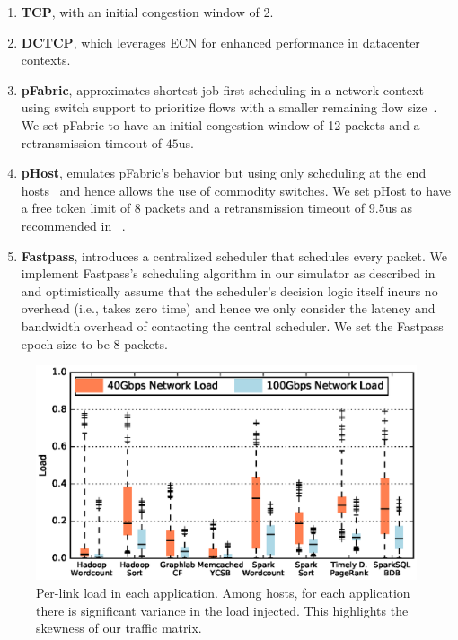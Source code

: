 \begin{enumerate}[leftmargin=*]
\itemsep0em
\item {\bf TCP}, with an initial congestion window of 2.
\item {\bf DCTCP}, which leverages ECN for enhanced performance in datacenter contexts.  
\item {\bf pFabric}, approximates shortest-job-first scheduling in a network context using switch support to prioritize  flows with a smaller remaining flow size~\cite{pfabric}. We set pFabric to have an initial congestion window of 12 packets and a retransmission timeout of $45$us.
%
\item {\bf pHost}, emulates pFabric's behavior but using only scheduling at the end hosts~\cite{phost} and hence allows the use of commodity switches. We set pHost to have a free token limit of 8 packets and a retransmission timeout of $9.5$us as recommended in ~\cite{phost}.
%
\item {\bf Fastpass}, introduces a centralized scheduler that schedules every packet. We implement Fastpass's scheduling algorithm in our simulator as described in ~\cite{phost} and optimistically assume that the scheduler's decision logic itself incurs no overhead (i.e., takes zero time) and hence we only consider the latency and bandwidth overhead of contacting the central scheduler. 
We set the Fastpass epoch size to be 8 packets.%
%
\end{enumerate}

\begin{figure}
  \centering
  \includegraphics[width = 6.5in]{img/load} 
  \caption{\small{Per-link load in each application. Among hosts, for each application there is significant variance in the load injected. This highlights the skewness of our traffic matrix.}}
  \label{fig:loadcdf}
\end{figure}




